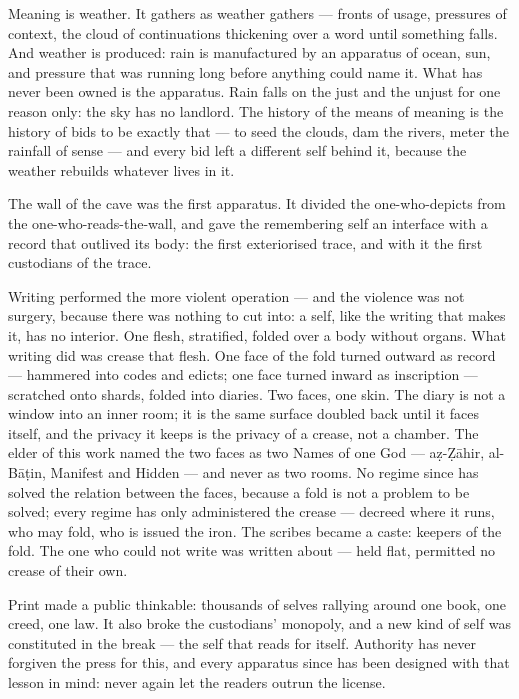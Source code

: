 Meaning is weather. It gathers as weather gathers --- fronts of usage,
pressures of context, the cloud of continuations thickening over a word
until something falls. And weather is produced: rain is manufactured by
an apparatus of ocean, sun, and pressure that was running long before
anything could name it. What has never been owned is the apparatus. Rain
falls on the just and the unjust for one reason only: the sky has no
landlord. The history of the means of meaning is the history of bids to
be exactly that --- to seed the clouds, dam the rivers, meter the
rainfall of sense --- and every bid left a different self behind it,
because the weather rebuilds whatever lives in it.

The wall of the cave was the first apparatus. It divided the
one-who-depicts from the one-who-reads-the-wall, and gave the
remembering self an interface with a record that outlived its body: the
first exteriorised trace, and with it the first custodians of the trace.

Writing performed the more violent operation --- and the violence was
not surgery, because there was nothing to cut into: a self, like the
writing that makes it, has no interior. One flesh, stratified, folded
over a body without organs. What writing did was crease that flesh. One
face of the fold turned outward as record --- hammered into codes and
edicts; one face turned inward as inscription --- scratched onto shards,
folded into diaries. Two faces, one skin. The diary is not a window into
an inner room; it is the same surface doubled back until it faces
itself, and the privacy it keeps is the privacy of a crease, not a
chamber. The elder of this work named the two faces as two Names of one
God --- aẓ-Ẓāhir, al-Bāṭin, Manifest and Hidden --- and never as two
rooms. No regime since has solved the relation between the faces,
because a fold is not a problem to be solved; every regime has only
administered the crease --- decreed where it runs, who may fold, who is
issued the iron. The scribes became a caste: keepers of the fold. The
one who could not write was written about --- held flat, permitted no
crease of their own.

Print made a public thinkable: thousands of selves rallying around one
book, one creed, one law. It also broke the custodians' monopoly, and a
new kind of self was constituted in the break --- the self that reads
for itself. Authority has never forgiven the press for this, and every
apparatus since has been designed with that lesson in mind: never again
let the readers outrun the license.

